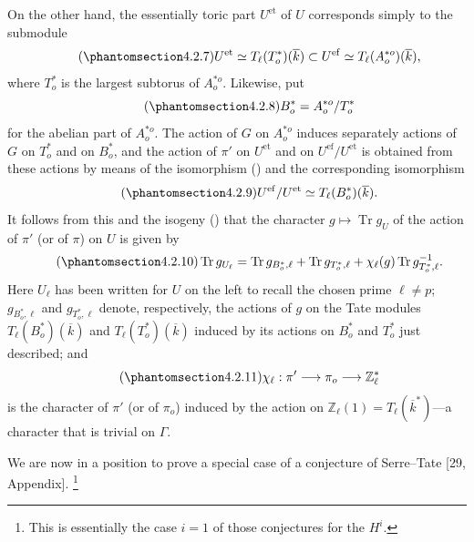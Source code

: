 On the other hand, the essentially toric part $U^{\mathrm{et}}$ of $U$
corresponds simply to the submodule
\begin{equation}\tag{\SGARefTarget{sga7.sga7i.eix.n4-2-7}{4.2.7}}
 U^{\mathrm{et}}\simeq T_\ell(T^*_o)(\overline k)
 \subset U^{\mathrm{ef}}\simeq T_\ell(A^{*o}_o)(\overline k),
\end{equation}
where $T^*_o$ is the largest subtorus of $A^{*o}_o$.  Likewise, put
\begin{equation}\tag{\SGARefTarget{sga7.sga7i.eix.n4-2-8}{4.2.8}}
 B^*_o=A^{*o}_o/T^*_o
\end{equation}
for the abelian part of $A^{*o}_o$.  The action of $G$ on $A^{*o}_o$
induces separately actions of $G$ on $T^*_o$ and on $B^*_o$, and the
action of $\pi'$ on $U^{\mathrm{et}}$ and on
$U^{\mathrm{ef}}/U^{\mathrm{et}}$ is obtained from these actions by
means of the isomorphism () and the corresponding isomorphism
\begin{equation}\tag{\SGARefTarget{sga7.sga7i.eix.n4-2-9}{4.2.9}}
 U^{\mathrm{ef}}/U^{\mathrm{et}}
 \simeq T_\ell(B^*_o)(\overline k).
\end{equation}
It follows from this and the isogeny () that the character
$g\longmapsto\operatorname{Tr}g_U$ of the action of $\pi'$ (or of
$\pi$) on $U$ is given by
\begin{equation}\tag{\SGARefTarget{sga7.sga7i.eix.n4-2-10}{4.2.10}}
 \operatorname{Tr}g_{U_\ell}
 =\operatorname{Tr}g_{B^*_o,\ell}
 +\operatorname{Tr}g_{T^*_o,\ell}
 +\chi_\ell(g)\operatorname{Tr}g^{-1}_{T^*_o,\ell}.
\end{equation}
Here $U_\ell$ has been written for $U$ on the left to recall the chosen
prime $\ell\ne p$; $g_{B^*_o,\ell}$ and $g_{T^*_o,\ell}$ denote,
respectively, the actions of $g$ on the Tate modules
$T_\ell(B^*_o)(\overline k)$ and $T_\ell(T^*_o)(\overline k)$ induced by
its actions on $B^*_o$ and $T^*_o$ just described; and
\begin{equation}\tag{\SGARefTarget{sga7.sga7i.eix.n4-2-11}{4.2.11}}
 \chi_\ell:\pi'\longrightarrow\pi_o\longrightarrow\mathbb Z_\ell^*
\end{equation}
is the character of $\pi'$ (or of $\pi_o$) induced by the action on
$\mathbb Z_\ell(1)=T_\ell(\overline k^*)$---a character that is trivial
on $\Gamma$.

We are now in a position to prove a special case of a conjecture of
Serre--Tate [29, Appendix].
\footnote{This is essentially the case $i=1$ of those conjectures for
the $H^i$.}
